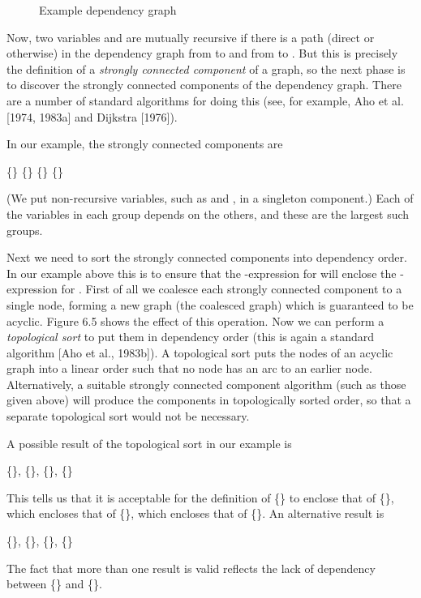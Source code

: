 {\begin{numbered}
\begin{figure}[h]
{\begin{minipage}{0.9\textwidth}
		\end{minipage}%

	}%

	\caption{\textsf Example dependency graph}
\end{figure}
\item Now, two variables  and  are mutually recursive if there is a path (direct
or otherwise) in the dependency graph from  to  and from  to . But this
is precisely the definition of a \textit{strongly connected component} of a graph, so
the next phase is to discover the strongly connected components of the
dependency graph. There are a number of standard algorithms for doing
this (see, for example, Aho et al. [1974, 1983a] and Dijkstra [1976]).

\phantom{x} In our example, the strongly connected components are
\begin{mlcoded}
	\{\} \{\} \{\} \{\}
\end{mlcoded}
(We put non-recursive variables, such as  and , in a singleton
component.) Each of the variables in each group depends on the others,
and these are the largest such groups.
\item Next we need to sort the strongly connected components into dependency
order. In our example above this is to ensure that the -expression for 
will enclose the -expression for . First of all we coalesce each strongly
connected component to a single node, forming a new graph (the
coalesced graph) which is guaranteed to be acyclic. Figure 6.5 shows the
effect of this operation. Now we can perform a \textit{topological sort} to put
them in dependency order (this is again a standard algorithm [Aho et al.,
1983b]). A topological sort puts the nodes of an acyclic graph into a linear
order such that no node has an arc to an earlier node. Alternatively, a
suitable strongly connected component algorithm (such as those given
above) will produce the components in topologically sorted order, so that
a separate topological sort would not be necessary.

\phantom{xx}A possible result of the topological sort in our example is
\begin{mlcoded}
	\{\}, \{\}, \{\}, \{\}
\end{mlcoded}
This tells us that it is acceptable for the definition of \{\} to enclose that of
\{\}, which encloses that of \{\}, which encloses that of \{\}. An
alternative result is
\begin{mlcoded}
	\{\}, \{\}, \{\}, \{\}
\end{mlcoded}
The fact that more than one result is valid reflects the lack of dependency
between \{\} and \{\}.


\end{numbered}}
